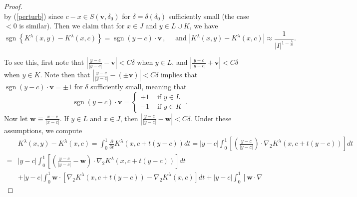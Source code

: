 \documentclass{amsart}%
\theoremstyle{plain}
\numberwithin{equation}{section}
\begin{document}
\begin{proof}
\begin{equation}
\end{equation}
by (\ref{perturb}) since $c-x\in S\left(  \mathbf{v},\delta_{0}\right)  $ for
$\delta= \delta(\delta_{0})$ sufficiently small (the case  $<0$ is similar). Then we claim that for $x \in J$ and $y
\in L \cup K$, we have
\begin{equation}
\operatorname{sgn} \left\{  K^{\lambda}\left(  x,y\right)  -K^{\lambda}\left(
x,c\right)  \right\}  = \operatorname{sgn}\left(  y-c\right)  \cdot\mathbf{v}
\, , \quad\text{ and } \left|  K^{\lambda}\left(  x,y\right)  -K^{\lambda
}\left(  x,c\right)  \right|  \approx\frac{1}{\left\vert I\right\vert
^{1-\frac{\lambda}{n}}}. \label{sign}%
\end{equation}


To see this, first note that $\left\vert \frac{y-c}{\left\vert y-c\right\vert
}-\mathbf{v}\right\vert <C\delta$ when $y\in L$, and $\left\vert \frac
{y-c}{\left\vert y-c\right\vert }+\mathbf{v}\right\vert <C\delta$ when $y\in
K$. Note then that $\left\vert \frac{y-c}{\left\vert y-c\right\vert }-\left(
\pm\mathbf{v}\right)  \right\vert <C\delta$ implies that $\operatorname{sgn}%
(y-c)\cdot\mathbf{v}=\pm1$ for $\delta$ sufficiently small, meaning that
\[
\operatorname{sgn}(y-c)\cdot\mathbf{v}=%
\begin{cases}
+1 & \text{ if }y\in L\\
-1 & \text{ if }y\in K
\end{cases}
\,.
\]
Now let $\mathbf{w}\equiv\frac{x-c}{\left\vert x-c\right\vert }$. If
$y\in L$ and $x\in J$, then $\left\vert \frac{y-c}{\left\vert
y-c\right\vert }-\mathbf{w}\right\vert <C\delta$. Under these assumptions, we
compute
\begin{align*}
	& K^{\lambda}\left(  x,y\right)  -K^{\lambda}\left(  x,c\right) =\int_{0}^{1}\frac{\partial}{\partial t}K^{\lambda}\left(  x,c  +t\left(  y-c\right)  \right)  dt =\left\vert y-c\right\vert \int_{0}^{1}\left[  \left(  \frac{y-c}{\left\vert y-c\right\vert }\right)  \cdot\nabla_{2}K^{\lambda}\left(
x,c  +t\left(  y-c\right)  \right)  \right]  dt\\
	=&\left\vert y-c\right\vert \int_{0}^{1}\left[  \left(  \frac{y-c}%
{\left\vert y-c\right\vert }-\mathbf{w}\right)  \cdot\nabla_{2}K^{\lambda
}\left(  x,c  +t\left(  y-c\right)  \right)  \right]  dt\\
&  +\left\vert y-c\right\vert \int_{0}^{1}\mathbf{w}\cdot\left[  \nabla
_{2}K^{\lambda}\left(  x,c  +t\left(  y-c\right)  \right)
-\nabla_{2}K^{\lambda}\left(  x,c\right)  \right]  dt  +\left\vert y-c\right\vert \int_{0}^{1}\left[  \mathbf{w}\cdot\nabla

\end{align*}
\end{proof}
\end{document}
